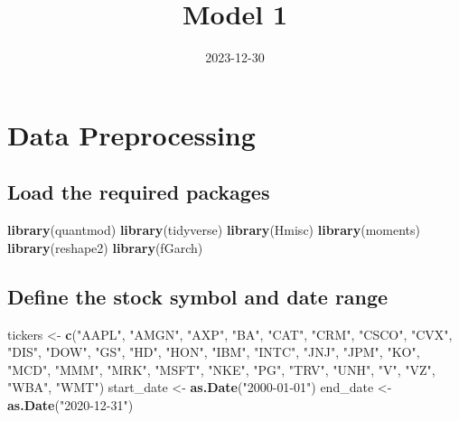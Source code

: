 \documentclass[
]{article}
\title{Model 1}
\author{}
\date{\vspace{-2.5em}2023-12-30}
\newenvironment{Shaded}{\begin{snugshade}}{\end{snugshade}}
\newcommand{\FunctionTok}[1]{\textcolor[rgb]{0.13,0.29,0.53}{\textbf{#1}}}
\newcommand{\NormalTok}[1]{#1}
\newcommand{\OtherTok}[1]{\textcolor[rgb]{0.56,0.35,0.01}{#1}}
\newcommand{\StringTok}[1]{\textcolor[rgb]{0.31,0.60,0.02}{#1}}
\begin{document}
\maketitle

\hypertarget{data-preprocessing}{%
\section{Data Preprocessing}\label{data-preprocessing}}

\hypertarget{load-the-required-packages}{%
\subsection{Load the required
packages}\label{load-the-required-packages}}

\begin{Shaded}
\begin{Highlighting}[]
\FunctionTok{library}\NormalTok{(quantmod)}
\FunctionTok{library}\NormalTok{(tidyverse)}
\FunctionTok{library}\NormalTok{(Hmisc)}
\FunctionTok{library}\NormalTok{(moments)}
\FunctionTok{library}\NormalTok{(reshape2)}
\FunctionTok{library}\NormalTok{(fGarch)}
\end{Highlighting}
\end{Shaded}

\hypertarget{define-the-stock-symbol-and-date-range}{%
\subsection{Define the stock symbol and date
range}\label{define-the-stock-symbol-and-date-range}}

\begin{Shaded}
\begin{Highlighting}[]
\NormalTok{tickers }\OtherTok{\textless{}{-}} \FunctionTok{c}\NormalTok{(}\StringTok{"AAPL"}\NormalTok{, }\StringTok{"AMGN"}\NormalTok{, }\StringTok{"AXP"}\NormalTok{, }\StringTok{"BA"}\NormalTok{, }\StringTok{"CAT"}\NormalTok{, }\StringTok{"CRM"}\NormalTok{, }\StringTok{"CSCO"}\NormalTok{, }\StringTok{"CVX"}\NormalTok{, }\StringTok{"DIS"}\NormalTok{, }\StringTok{"DOW"}\NormalTok{,}
            \StringTok{"GS"}\NormalTok{, }\StringTok{"HD"}\NormalTok{, }\StringTok{"HON"}\NormalTok{, }\StringTok{"IBM"}\NormalTok{, }\StringTok{"INTC"}\NormalTok{, }\StringTok{"JNJ"}\NormalTok{, }\StringTok{"JPM"}\NormalTok{, }\StringTok{"KO"}\NormalTok{, }\StringTok{"MCD"}\NormalTok{, }\StringTok{"MMM"}\NormalTok{,}
            \StringTok{"MRK"}\NormalTok{, }\StringTok{"MSFT"}\NormalTok{, }\StringTok{"NKE"}\NormalTok{, }\StringTok{"PG"}\NormalTok{, }\StringTok{"TRV"}\NormalTok{, }\StringTok{"UNH"}\NormalTok{, }\StringTok{"V"}\NormalTok{, }\StringTok{"VZ"}\NormalTok{, }\StringTok{"WBA"}\NormalTok{, }\StringTok{"WMT"}\NormalTok{)}
\NormalTok{start\_date }\OtherTok{\textless{}{-}} \FunctionTok{as.Date}\NormalTok{(}\StringTok{"2000{-}01{-}01"}\NormalTok{)}
\NormalTok{end\_date }\OtherTok{\textless{}{-}} \FunctionTok{as.Date}\NormalTok{(}\StringTok{"2020{-}12{-}31"}\NormalTok{)}
\end{Highlighting}
\end{Shaded}
\end{document}
